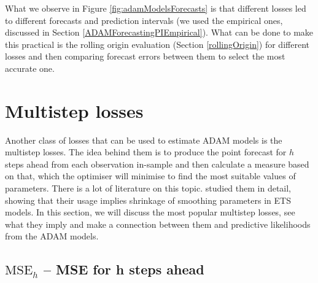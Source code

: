 \documentclass[
]{book}
\theoremstyle{definition}
\theoremstyle{definition}
\theoremstyle{definition}
\theoremstyle{definition}
\theoremstyle{remark}
\begin{document}
What we observe in Figure \ref{fig:adamModelsForecasts} is that different losses led to different forecasts and prediction intervals (we used the empirical ones, discussed in Section \ref{ADAMForecastingPIEmpirical}). What can be done to make this practical is the rolling origin evaluation (Section \ref{rollingOrigin}) for different losses and then comparing forecast errors between them to select the most accurate one.

\hypertarget{multistepLosses}{%
\section{Multistep losses}\label{multistepLosses}}

Another class of losses that can be used to estimate ADAM models is the multistep losses. The idea behind them is to produce the point forecast for \(h\) steps ahead from each observation in-sample and then calculate a measure based on that, which the optimiser will minimise to find the most suitable values of parameters. There is a lot of literature on this topic. \citet{Svetunkov2020Multistep} studied them in detail, showing that their usage implies shrinkage of smoothing parameters in ETS models. In this section, we will discuss the most popular multistep losses, see what they imply and make a connection between them and predictive likelihoods from the ADAM models.

\hypertarget{mathrmmse_h-mse-for-h-steps-ahead}{%
\subsection{\texorpdfstring{\(\mathrm{MSE}_h\) -- MSE for h steps ahead}{\textbackslash mathrm\{MSE\}\_h -- MSE for h steps ahead}}\label{mathrmmse_h-mse-for-h-steps-ahead}}
\end{document}
